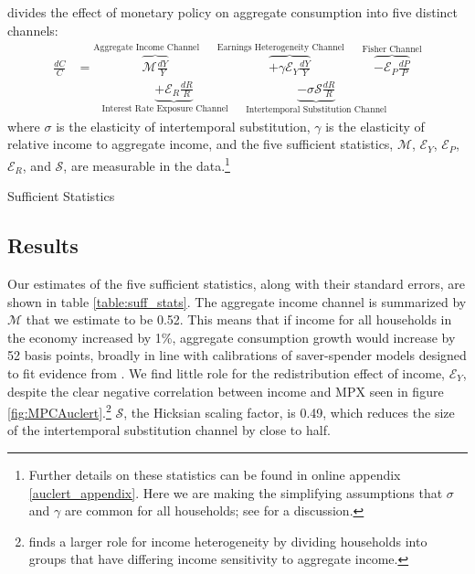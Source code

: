 \documentclass[titlepage]{\econtex}\newcommand{\texname}{ConsumptionHeterogeneity}
\begin{document}
	\cite{auclert_monetary_2017} divides the effect of monetary policy on aggregate consumption into five distinct channels:
	\begingroup
	\allowdisplaybreaks[0]
	\begin{align} 
	\frac{dC}{C} &= \overbrace{\mathcal{M}\frac{dY}{Y}}^{\text{Aggregate Income Channel}\qquad} \overbrace{ + \gamma \mathcal{E}_Y \frac{dY}{Y}}^{\text{Earnings Heterogeneity Channel}\qquad} \overbrace{ - \mathcal{E}_P\frac{dP}{P}}^{\text{Fisher Channel}}  \nonumber \\
	& \qquad \underbrace{ + \mathcal{E}_R \frac{dR}{R}}_{\text{Interest Rate Exposure Channel}\qquad}  \underbrace{ - \sigma \mathcal{S}\frac{dR}{R}}_{\text{Intertemporal Substitution Channel}} \label{auclert_channels}
	\end{align}
	\endgroup
	where $\sigma$ is the elasticity of intertemporal substitution, $\gamma$ is the elasticity of relative income to aggregate income, and the five sufficient statistics, $\mathcal{M}$, $\mathcal{E}_Y$, $\mathcal{E}_P$, $\mathcal{E}_R$, and $\mathcal{S}$, are measurable in the data.\footnote{Further details on these statistics can be found in online appendix \ref{auclert_appendix}. Here we are making the simplifying assumptions that $\sigma$ and $\gamma$ are common for all households; see \cite{auclert_monetary_2017} for a discussion.}
	
	\begin{center}
	\begin{table}
		\caption{Sufficient Statistics}
		\label{table:suff_stats}
		\begin{center}
			
		\end{center}
	\end{table}
	\end{center}

	\subsection{Results}
	Our estimates of the five sufficient statistics, along with their standard errors, are shown in table \ref{table:suff_stats}. The aggregate income channel is summarized by $\mathcal{M}$ that we estimate to be 0.52. This means that if income for all households in the economy increased by 1\%, aggregate consumption growth would increase by 52 basis points, broadly in line with calibrations of saver-spender models designed to fit evidence from \cite{campbell_consumption_1989}. We find little role for the redistribution effect of income, $\mathcal{E}_Y$, despite the clear negative correlation between income and MPX seen in figure \ref{fig:MPCAuclert}.\footnote{\cite{patterson_2019} finds a larger role for income heterogeneity by dividing households into groups that have differing income sensitivity to aggregate income.} $\mathcal{S}$, the Hicksian scaling factor, is 0.49, which reduces the size of the intertemporal substitution channel by close to half.
\end{document}
